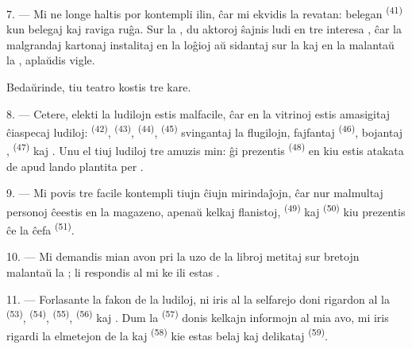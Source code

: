 7. --- Mi ne longe haltis por kontempli ilin, ĉar mi ekvidis la revatan:
belegan  \textsuperscript{(41)} kun belegaj
 kaj raviga  ruĝa. Sur la , du
aktoroj ŝajnis ludi  en tre interesa , ĉar la
malgrandaj  kartonaj instalitaj en la loĝioj aŭ sidantaj sur
la  kaj en la  malantaŭ la
, aplaŭdis vigle.

Bedaŭrinde, tiu teatro kostis tre kare.

8. --- Cetere, elekti la ludilojn estis malfacile, ĉar en la vitrinoj estis
amasigitaj ĉiaspecaj ludiloj:  \textsuperscript{(42)},
 \textsuperscript{(43)}, 
\textsuperscript{(44)},  \textsuperscript{(45)} svingantaj la
flugilojn, fajfantaj  \textsuperscript{(46)}, bojantaj
,  \textsuperscript{(47)} kaj
. Unu el tiuj ludiloj tre amuzis min: ĝi
prezentis  \textsuperscript{(48)} en kiu 
estis atakata de  apud lando plantita per .


9. --- Mi povis tre facile kontempli tiujn ĉiujn mirindaĵojn, ĉar nur malmultaj
personoj ĉeestis en la magazeno, apenaŭ kelkaj flanistoj, 
\textsuperscript{(49)} kaj  \textsuperscript{(50)} kiu
prezentis  ĉe la ĉefa  \textsuperscript{(51)}.

10. --- Mi demandis mian avon pri la uzo de la libroj metitaj sur bretojn
malantaŭ la ; li respondis al mi ke ili estas
.

\VUsaut{3.6mm}
\VUsaut{2.8mm}

11. --- Forlasante la fakon de la ludiloj, ni iris al la selfarejo doni rigardon
al la  \textsuperscript{(53)}, 
\textsuperscript{(54)},  \textsuperscript{(55)},
 \textsuperscript{(56)} kaj . Dum la
 \textsuperscript{(57)} donis kelkajn informojn al mia avo, mi
iris rigardi la elmetejon de la  kaj 
\textsuperscript{(58)} kie estas belaj  kaj delikataj
 \textsuperscript{(59)}.

